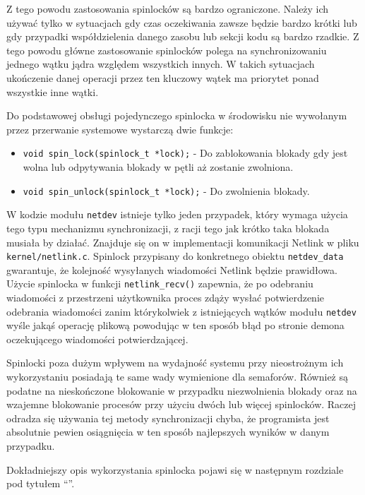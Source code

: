 \documentclass[11pt]{scrartcl}
\begin{document}
Z tego powodu zastosowania spinlocków są bardzo ograniczone. Należy ich używać tylko w sytuacjach gdy czas oczekiwania zawsze będzie bardzo krótki lub gdy przypadki współdzielenia danego zasobu lub sekcji kodu są bardzo rzadkie. Z tego powodu główne zastosowanie spinlocków polega na synchronizowaniu jednego wątku jądra względem wszystkich innych. W takich sytuacjach ukończenie danej operacji przez ten kluczowy wątek ma priorytet ponad wszystkie inne wątki.

Do podstawowej obsługi pojedynczego spinlocka w środowisku nie wywołanym przez przerwanie systemowe wystarczą dwie funkcje:

\begin{itemize}
\itemsep1pt\parskip0pt
\item
  \texttt{void spin\_lock(spinlock\_t *lock);} - Do zablokowania blokady gdy jest wolna lub odpytywania blokady w pętli aż zostanie zwolniona.
\item
  \texttt{void spin\_unlock(spinlock\_t *lock);} - Do zwolnienia blokady.
\end{itemize}

W kodzie modułu \texttt{netdev} istnieje tylko jeden przypadek, który wymaga użycia tego typu mechanizmu synchronizacji, z racji tego jak krótko taka blokada musiała by działać. Znajduje się on w implementacji komunikacji Netlink w pliku \texttt{kernel/netlink.c}. Spinlock przypisany do konkretnego obiektu \texttt{netdev\_data} gwarantuje, że kolejność wysyłanych wiadomości Netlink będzie prawidłowa. Użycie spinlocka w funkcji \texttt{netlink\_recv()} zapewnia, że po odebraniu wiadomości z przestrzeni użytkownika proces zdąży wysłać potwierdzenie odebrania wiadomości zanim którykolwiek z istniejących wątków modułu \texttt{netdev} wyśle jakąś operację plikową powodując w ten sposób błąd po stronie demona oczekującego wiadomości potwierdzającej.

Spinlocki poza dużym wpływem na wydajność systemu przy nieostrożnym ich wykorzystaniu posiadają te same wady wymienione dla semaforów. Również są podatne na nieskończone blokowanie w przypadku niezwolnienia blokady oraz na wzajemne blokowanie procesów przy użyciu dwóch lub więcej spinlocków. Raczej odradza się używania tej metody synchronizacji chyba, że programista jest absolutnie pewien osiągnięcia w ten sposób najlepszych wyników w danym przypadku.

Dokładniejszy opis wykorzystania spinlocka pojawi się w następnym rozdziale pod tytułem ``''.
\end{document}
